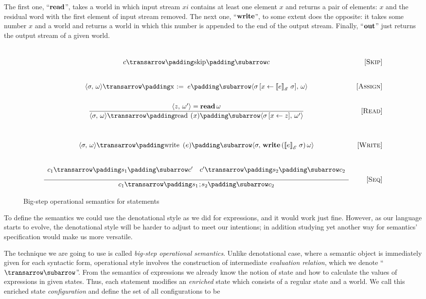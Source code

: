 The first one, ``$\mathbf{read}$'', takes a world in which input stream $xi$ contains at least one element $x$ and returns a pair of elements: $x$ and the residual
word with the first element of input stream removed. The next one, ``$\mathbf{write}$'', to some extent does the opposite: it takes some number $x$ and a world and
returns a world in which this number is appended to the end of the output stream. Finally, ``$\mathbf{out}$'' just returns the output stream of a given world.

\setarrow{\xRightarrow}

\begin{figure}[t]
  \[
  \def\arraystretch{3}
  \arraycolsep=5pt
  \begin{array}{cr}
    \trans{c}{\llang{skip}}{c} & \ruleno{Skip}\\
    \trans{\inbr{\sigma,\, \omega}}{\llang{x := $\;\;e$}}{\inbr{\sigma\,[x\gets\sembr{e}^\ph_{\mathscr E}\;\sigma],\,\omega}} & \ruleno{Assign} \\
    \trule{\inbr{z,\,\omega^\prime}=\primi{read}{\,\omega}}
          {\trans{\inbr{\sigma,\, \omega}}{\llang{read ($x$)}}{\inbr{\sigma\,[x\gets z],\,\omega^\prime}}} & \ruleno{Read} \\[5mm]
    \trans{\inbr{\sigma,\, \omega}}{\llang{write ($e$)}}{\inbr{\sigma,\, \primi{write}{\,(\sembr{e}^\ph_{\mathscr E}\;\sigma)\, \omega}}}& \ruleno{Write} \\
    \trule{\begin{array}{cc}
              \trans{c_1}{s_1}{c^\prime} & \trans{c^\prime}{s_2}{c_2}
           \end{array}}
          {\trans{c_1}{s_1\llang{;}s_2}{c_2}} & \ruleno{Seq}
  \end{array}
  \]
\caption{Big-step operational semantics for statements}
\label{bs_stmt}
\end{figure}

To define the semantics we could use the denotational style as we did for expressions, and it would work just fine. However, as our language starts to evolve,
the denotational style will be harder to adjust to meet our intentions; in addition studying yet another way for semantics' specification would make us more
versatile.

The technique we are going to use is called \emph{big-step operational semantics}. Unlike denotational case, where a semantic object
is immediately given for each syntactic form, operational style involves the construction of intermediate \emph{evaluation relation}, which we
denote ``$\transrel$''. From the semantics of expressions we already know the notion of state and how to calculate the
values of expressions in given states. Thus, each statement modifies an \emph{enriched} state which consists of a regular state and a world. We call this
enriched state \emph{configuration} and define the set of all configurations to be

